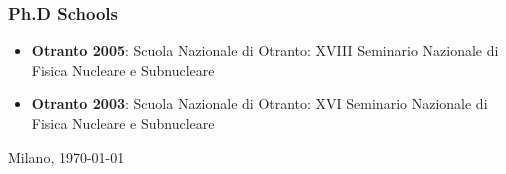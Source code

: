 \subsubsection*{Ph.D Schools}
 \begin{itemize}
  \item {\bf Otranto 2005}: Scuola Nazionale di Otranto: XVIII Seminario Nazionale di Fisica Nucleare e Subnucleare
  \item {\bf Otranto 2003}: Scuola Nazionale di Otranto: XVI Seminario Nazionale di Fisica Nucleare e Subnucleare
 \end{itemize}
%
%
%
\vspace{2\baselineskip}
\noindent Milano, \today